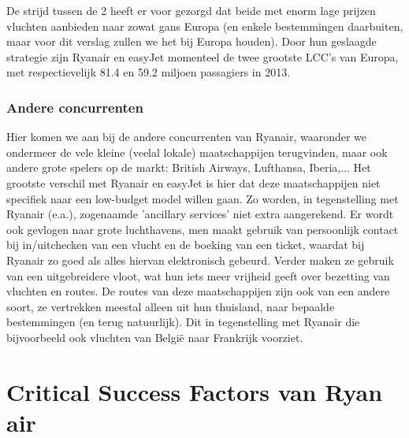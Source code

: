 \documentclass{article}
\begin{document}
De strijd tussen de 2 heeft er voor gezorgd dat beide met enorm lage prijzen vluchten aanbieden naar zowat gans Europa (en enkele bestemmingen daarbuiten, maar voor dit verslag zullen we het bij Europa houden). Door hun geslaagde strategie zijn Ryanair en easyJet momenteel de twee grootste LCC's van Europa, met respectievelijk 81.4 en 59.2 miljoen passagiers in 2013.

\section{Andere concurrenten}

Hier komen we aan bij de andere concurrenten van Ryanair, waaronder we ondermeer de vele kleine (veelal lokale) maatschappijen terugvinden, maar ook andere grote spelers op de markt: British Airways, Lufthansa, Iberia,... 
Het grootste verschil met Ryanair en easyJet is hier dat deze maatschappijen niet specifiek naar een low-budget model willen gaan. Zo worden, in tegenstelling met Ryanair (e.a.), zogenaamde 'ancillary services' niet extra aangerekend. Er wordt ook gevlogen naar grote luchthavens, men maakt gebruik van persoonlijk contact bij in/uitchecken van een vlucht en de boeking van een ticket, waardat bij Ryanair zo goed als alles hiervan elektronisch gebeurd. Verder maken ze gebruik van een uitgebreidere vloot, wat hun iets meer vrijheid geeft over bezetting van vluchten en routes.
De routes van deze maatschappijen zijn ook van een andere soort, ze vertrekken meestal alleen uit hun thuisland, naar bepaalde bestemmingen (en terug natuurlijk). Dit in tegenstelling met Ryanair die bijvoorbeeld ook vluchten van Belgi\"e naar Frankrijk voorziet.

\part{Critical Success Factors van Ryan air}
\end{document}
